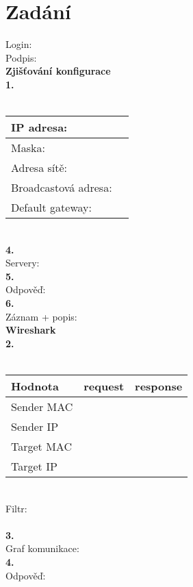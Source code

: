 \section{Zadání}
Login:\\
Podpis:\\

\textbf{Zjišťování konfigurace}\\
\textbf{1.}\\
\\
\begin{tabular}{|l|r|}
\hline
IP adresa: & \hspace{12em} \\
\hline
Maska: & \\
\hline
Adresa sítě: & \\
\hline
Broadcastová adresa: & \\
\hline
Default gateway: & \\
\hline
\end{tabular}
\vspace{1.5em}
\\
\textbf{4.}\\
\vspace{8em}
Servery:\\
\textbf{5.}\\
\vspace{4em}
Odpověď:\\
\textbf{6.}\\
\vspace{5em}
Záznam + popis:\\
\newpage
\noindent
\textbf{Wireshark}\\
\textbf{2.}\\
\\
\begin{tabular}{|l|c|c|}
\hline
\textbf{Hodnota} & \textbf{request} & \textbf{response}\\
\hline
Sender MAC & \hspace{10em} & \hspace{10em} \\
\hline
Sender IP & & \\
\hline
Target MAC & & \\
\hline
Target IP & & \\
\hline
\end{tabular}
\vspace{2em}
\\
Filtr:\\
\\
\textbf{3.}\\
\vspace{25em}
Graf komunikace:\\
\textbf{4.}\\
Odpověď:
